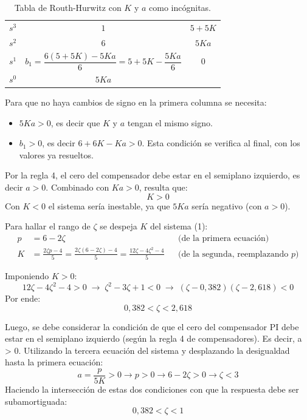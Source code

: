 \documentclass[10pt]{article}
\begin{document}
\begin{table}[h!]
\centering
\begin{tabular}{c|cc}
$s^3$ & $1$ & $5+5K$ \\
$s^2$ & $6$ & $5Ka$ \\
$s^1$ & $b_1 = \dfrac{6(5+5K) - 5Ka}{6} = 5 + 5K - \dfrac{5Ka}{6}$ & $0$ \\
$s^0$ & $5Ka$ & \\
\end{tabular}
\caption{Tabla de Routh-Hurwitz con $K$ y $a$ como incógnitas.}
\end{table}

Para que no haya cambios de signo en la primera columna se necesita:
\begin{itemize}
    \item $5Ka > 0$, es decir que $K$ y $a$ tengan el mismo signo.
    \item $b_1 > 0$, es decir $6 + 6K - Ka > 0$. Esta condición se verifica al final,
    con los valores ya resueltos.
\end{itemize}

Por la regla 4, el cero del compensador debe estar en el semiplano izquierdo, es decir $a > 0$. Combinado con $Ka > 0$, resulta que:
\[
K > 0
\]
Con $K < 0$ el sistema sería inestable, ya que $5Ka$ sería negativo (con $a>0$).

Para hallar el rango de $\zeta$ se despeja $K$ del sistema (1):
\begin{align*}
p &= 6 - 2\zeta && \text{(de la primera ecuación)} \\
K &= \frac{2\zeta p - 4}{5} = \frac{2\zeta(6 - 2\zeta) - 4}{5} = \frac{12\zeta - 4\zeta^2 - 4}{5} && \text{(de la segunda, reemplazando } p\text{)}
\end{align*}

Imponiendo $K > 0$:
\[
12\zeta - 4\zeta^2 - 4 > 0 \;\rightarrow\; \zeta^2 - 3\zeta + 1 < 0 \;\rightarrow\; (\zeta - 0{,}382)(\zeta - 2{,}618) < 0
\]
Por ende:
\[
0{,}382 < \zeta < 2{,}618
\]

Luego, se debe considerar la condición de que el cero del compensador PI debe estar en el semiplano izquierdo (según la regla 4 de compensadores).
Es decir, a > 0. Utilizando la tercera ecuación del sistema y desplazando la desigualdad hasta la primera ecuación:
\[
a = \frac{p}{5K} > 0 \rightarrow p > 0 \rightarrow 6 - 2\zeta > 0 \rightarrow \zeta < 3
\]
Haciendo la intersección de estas dos condiciones con que la respuesta debe ser subamortiguada:
\begin{equation}
    \boxed{0,382 < \zeta < 1}
\end{equation}
\end{document}
